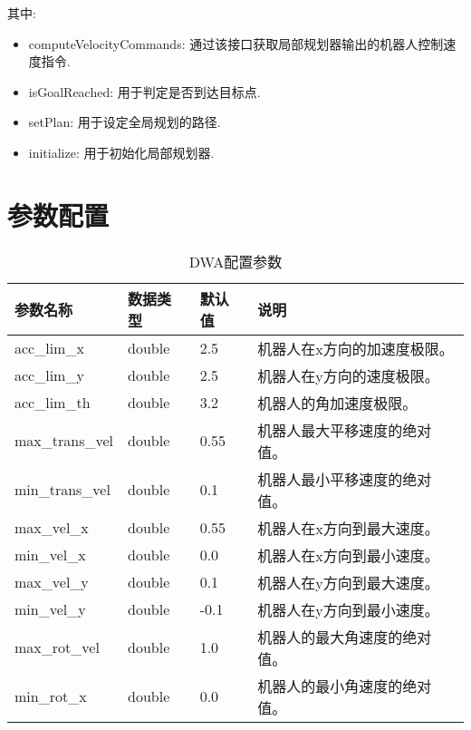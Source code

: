   其中:
  \begin{itemize}
    \item computeVelocityCommands: 通过该接口获取局部规划器输出的机器人控制速度指令.
    \item isGoalReached: 用于判定是否到达目标点.
    \item setPlan: 用于设定全局规划的路径.
    \item initialize: 用于初始化局部规划器.
  \end{itemize}

  \section{参数配置}

  \begin{table}[th]
    \caption{DWA配置参数}  
    \begin{center}  
    \begin{tabular}{|l|l|l|p{8cm}|}  
    \hline  
    参数名称 & 数据类型 & 默认值 & 说明  \\ \hline  
    acc\_lim\_x & double & 2.5 & 机器人在x方向的加速度极限。 \\  \hline  
    acc\_lim\_y & double & 2.5 & 机器人在y方向的速度极限。 \\  \hline  
    acc\_lim\_th & double & 3.2 & 机器人的角加速度极限。 \\  \hline  
    max\_trans\_vel & double & 0.55 & 机器人最大平移速度的绝对值。 \\  \hline  
    min\_trans\_vel & double & 0.1 & 机器人最小平移速度的绝对值。 \\  \hline  
    max\_vel\_x & double & 0.55 & 机器人在x方向到最大速度。 \\  \hline  
    min\_vel\_x & double & 0.0 & 机器人在x方向到最小速度。 \\  \hline  
    max\_vel\_y & double & 0.1 & 机器人在y方向到最大速度。 \\  \hline  
    min\_vel\_y & double & -0.1 & 机器人在y方向到最小速度。 \\  \hline  
    max\_rot\_vel & double & 1.0 & 机器人的最大角速度的绝对值。 \\  \hline  
    min\_rot\_x & double & 0.0 & 机器人的最小角速度的绝对值。 \\  \hline  
    
  
    \end{tabular}  
    \end{center}  
    \end{table} 


